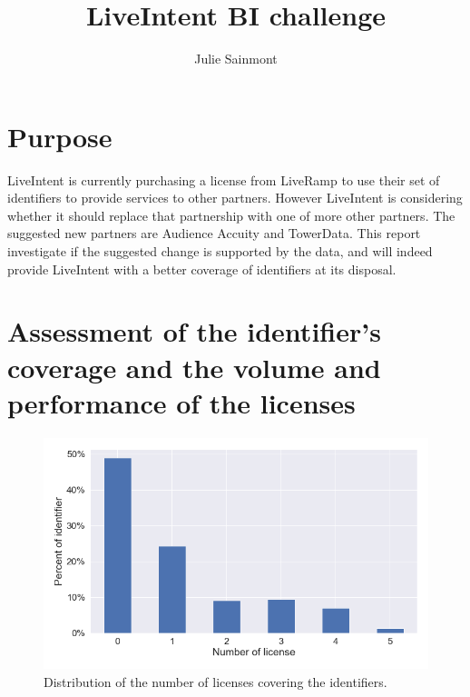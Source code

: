 \documentclass[11pt]{article} %
\title{LiveIntent BI challenge}
\author{Julie Sainmont}
\begin{document}
\maketitle

\section{Purpose}
LiveIntent is currently purchasing a license from LiveRamp to use their set of identifiers to provide services to other partners. However LiveIntent is considering whether it should replace that partnership with one of more other partners. The suggested new partners are Audience Accuity and TowerData. This report investigate if the suggested change is supported by the data, and will indeed provide LiveIntent with a better coverage of identifiers at its disposal. \\

\section{Assessment of the identifier's coverage and the volume and performance of the licenses}
\begin{figure}[h!]
  \includegraphics[width=0.8\linewidth]{../outputs/distribution_identifier_license.png}
  \caption{Distribution of the number of licenses covering the identifiers.}
  \label{fig:nr_licences_per_identifier}
\end{figure}
\end{document}

